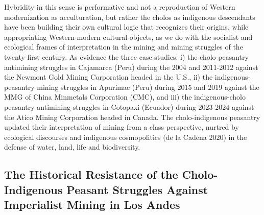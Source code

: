 \documentclass[]{interact}
\theoremstyle{plain}%
\theoremstyle{definition}
\theoremstyle{remark}
\begin{document}
Hybridity in this sense is performative and not a reproduction of Western modernization as acculturation, but rather the cholos as indigenous descendants have been building their own cultural logic that recognizes their origins, while appropriating Western-modern cultural objects, as we do with the socialist and ecological frames of interpretation in the mining and mining struggles of the twenty-first century. As evidence the three case studies: i) the cholo-peasantry antimining struggles in Cajamarca (Peru) during the 2004 and 2011-2012 against the Newmont Gold Mining Corporation headed in the U.S., ii) the indigenous-peasantry mining struggles in Apurímac (Peru) during 2015 and 2019 against the MMG of China Minmetals Corporation (CMC), and iii) the indigenous-cholo peasantry antimining struggles in Cotopaxi (Ecuador) during 2023-2024 against the Atico Mining Corporation headed in Canada. The cholo-indigenous peasantry updated their interpretation of mining from a class perspective, nurtred by ecological discourses and indigenous cosmopolitics (de la Cadena 2020) in the defense of water, land, life and biodiversity. 

\subsection{The Historical Resistance of the Cholo-Indigenous Peasant Struggles Against Imperialist Mining in Los Andes}
\end{document}
